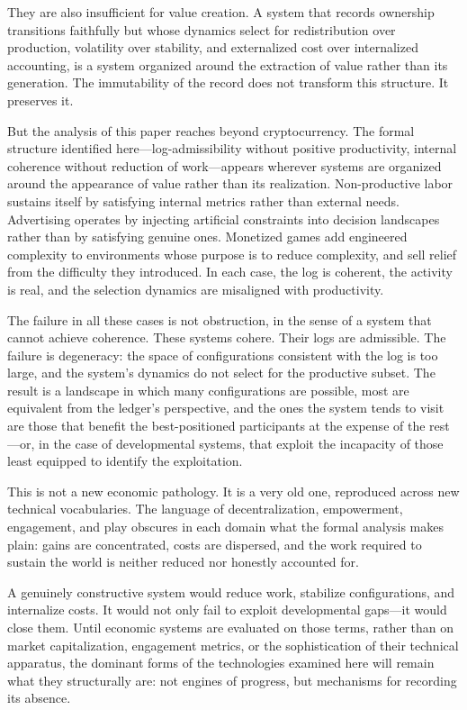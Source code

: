 \documentclass[12pt, oneside]{article}
\theoremstyle{definition}
\begin{document}
They are also insufficient for value creation. A system that records ownership transitions faithfully but whose dynamics select for redistribution over production, volatility over stability, and externalized cost over internalized accounting, is a system organized around the extraction of value rather than its generation. The immutability of the record does not transform this structure. It preserves it.

But the analysis of this paper reaches beyond cryptocurrency. The formal structure identified here---log-admissibility without positive productivity, internal coherence without reduction of work---appears wherever systems are organized around the appearance of value rather than its realization. Non-productive labor sustains itself by satisfying internal metrics rather than external needs. Advertising operates by injecting artificial constraints into decision landscapes rather than by satisfying genuine ones. Monetized games add engineered complexity to environments whose purpose is to reduce complexity, and sell relief from the difficulty they introduced. In each case, the log is coherent, the activity is real, and the selection dynamics are misaligned with productivity.

The failure in all these cases is not obstruction, in the sense of a system that cannot achieve coherence. These systems cohere. Their logs are admissible. The failure is degeneracy: the space of configurations consistent with the log is too large, and the system's dynamics do not select for the productive subset. The result is a landscape in which many configurations are possible, most are equivalent from the ledger's perspective, and the ones the system tends to visit are those that benefit the best-positioned participants at the expense of the rest---or, in the case of developmental systems, that exploit the incapacity of those least equipped to identify the exploitation.

This is not a new economic pathology. It is a very old one, reproduced across new technical vocabularies. The language of decentralization, empowerment, engagement, and play obscures in each domain what the formal analysis makes plain: gains are concentrated, costs are dispersed, and the work required to sustain the world is neither reduced nor honestly accounted for.

A genuinely constructive system would reduce work, stabilize configurations, and internalize costs. It would not only fail to exploit developmental gaps---it would close them. Until economic systems are evaluated on those terms, rather than on market capitalization, engagement metrics, or the sophistication of their technical apparatus, the dominant forms of the technologies examined here will remain what they structurally are: not engines of progress, but mechanisms for recording its absence.
\end{document}
